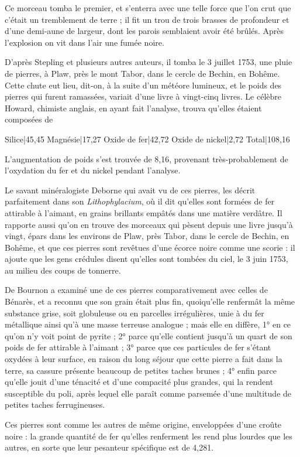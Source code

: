 \documentclass[a4paper, 12pt, oneside, french]{article}
\begin{document}
Ce morceau tomba le premier, et s'enterra avec une telle force que l'on crut que c'était un tremblement de terre ; il fit un trou de trois brasses de profondeur et d'une demi-aune de largeur, dont les parois semblaient avoir été brûlés. Après l'explosion on vit dans l'air une fumée noire.

D'après Stepling et plusieurs autres auteurs, il tomba le 3 juillet 1753, une pluie de pierres, à Plaw, près le mont Tabor, dans le cercle de Bechin, en Bohême. Cette chute eut lieu, dit-on, à la suite d'un météore lumineux, et le poids des pierres qui furent ramassées, variait d'une livre à vingt-cinq livres. Le célèbre Howard, chimiste anglais, en ayant fait l'analyse, trouva qu'elles étaient composées de

Silice|45,45  
Magnésie|17,27  
Oxide de fer|42,72  
Oxide de nickel|2,72  
Total|108,16

L'augmentation de poids s'est trouvée de 8,16, provenant très-probablement de l'oxydation du fer et du nickel pendant l'analyse.

Le savant minéralogiste Deborne qui avait vu de ces pierres, les décrit parfaitement dans son \emph{Lithophylacium}, où il dit qu'elles sont formées de fer attirable à l'aimant, en grains brillants empâtés dans une matière verdâtre. Il rapporte aussi qu'on en trouve des morceaux qui pèsent depuis une livre jusqu'à vingt, épars dans les environs de Plaw, près Tabor, dans le cercle de Bechin, en Bohême, et que ces pierres sont revêtues d'une écorce noire comme une scorie : il ajoute que les gens crédules disent qu'elles sont tombées du ciel, le 3 juin 1753, au milieu des coups de tonnerre.

De Bournon a examiné une de ces pierres comparativement avec celles de Bénarès, et a reconnu que son grain était plus fin, quoiqu'elle renfermât la même substance grise, soit globuleuse ou en parcelles irrégulières, unie à du fer métallique ainsi qu'à une masse terreuse analogue ; mais elle en diffère, 1° en ce qu'on n'y voit point de pyrite ; 2° parce qu'elle contient jusqu'à un quart de son poids de fer attirable à l'aimant ; 3° parce que ces particules de fer s'étant oxydées à leur surface, en raison du long séjour que cette pierre a fait dans la terre, sa cassure présente beaucoup de petites taches brunes ; 4° enfin parce qu'elle jouit d'une ténacité et d'une compacité plus grandes, qui la rendent susceptible du poli, après lequel elle paraît comme parsemée d'une multitude de petites taches ferrugineuses.

Ces pierres sont comme les autres de même origine, enveloppées d'une croûte noire : la grande quantité de fer qu'elles renferment les rend plus lourdes que les autres, en sorte que leur pesanteur spécifique est de 4,281.
\end{document}
